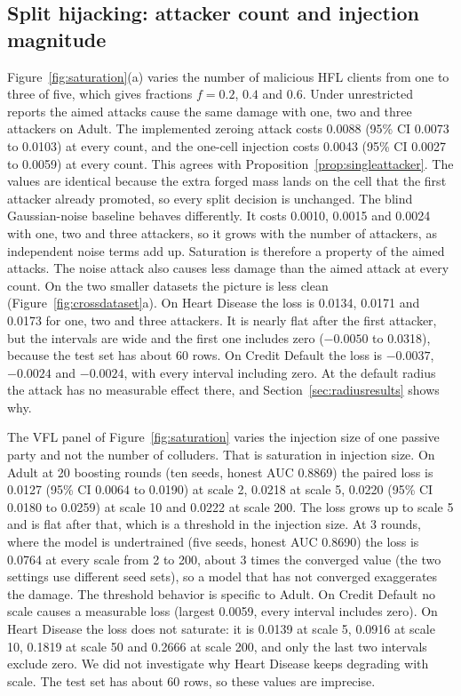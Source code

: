 \documentclass[11pt]{article}
\begin{document}
\subsection{Split hijacking: attacker count and injection magnitude}
\label{sec:saturationresults}

Figure~\ref{fig:saturation}(a) varies the number of malicious HFL clients from one to three of five, which gives fractions $f=0.2$, $0.4$ and $0.6$. Under unrestricted reports the aimed attacks cause the same damage with one, two and three attackers on Adult. The implemented zeroing attack costs 0.0088 (95\% CI 0.0073 to 0.0103) at every count, and the one-cell injection costs 0.0043 (95\% CI 0.0027 to 0.0059) at every count. This agrees with Proposition~\ref{prop:singleattacker}. The values are identical because the extra forged mass lands on the cell that the first attacker already promoted, so every split decision is unchanged. The blind Gaussian-noise baseline behaves differently. It costs 0.0010, 0.0015 and 0.0024 with one, two and three attackers, so it grows with the number of attackers, as independent noise terms add up. Saturation is therefore a property of the aimed attacks. The noise attack also causes less damage than the aimed attack at every count. On the two smaller datasets the picture is less clean (Figure~\ref{fig:crossdataset}a). On Heart Disease the loss is 0.0134, 0.0171 and 0.0173 for one, two and three attackers. It is nearly flat after the first attacker, but the intervals are wide and the first one includes zero ($-0.0050$ to 0.0318), because the test set has about 60 rows. On Credit Default the loss is $-0.0037$, $-0.0024$ and $-0.0024$, with every interval including zero. At the default radius the attack has no measurable effect there, and Section~\ref{sec:radiusresults} shows why.

The VFL panel of Figure~\ref{fig:saturation} varies the injection size of one passive party and not the number of colluders. That is saturation in injection size. On Adult at 20 boosting rounds (ten seeds, honest AUC 0.8869) the paired loss is 0.0127 (95\% CI 0.0064 to 0.0190) at scale 2, 0.0218 at scale 5, 0.0220 (95\% CI 0.0180 to 0.0259) at scale 10 and 0.0222 at scale 200. The loss grows up to scale 5 and is flat after that, which is a threshold in the injection size. At 3 rounds, where the model is undertrained (five seeds, honest AUC 0.8690) the loss is 0.0764 at every scale from 2 to 200, about 3 times the converged value (the two settings use different seed sets), so a model that has not converged exaggerates the damage. The threshold behavior is specific to Adult. On Credit Default no scale causes a measurable loss (largest 0.0059, every interval includes zero). On Heart Disease the loss does not saturate: it is 0.0139 at scale 5, 0.0916 at scale 10, 0.1819 at scale 50 and 0.2666 at scale 200, and only the last two intervals exclude zero. We did not investigate why Heart Disease keeps degrading with scale. The test set has about 60 rows, so these values are imprecise.
\end{document}
